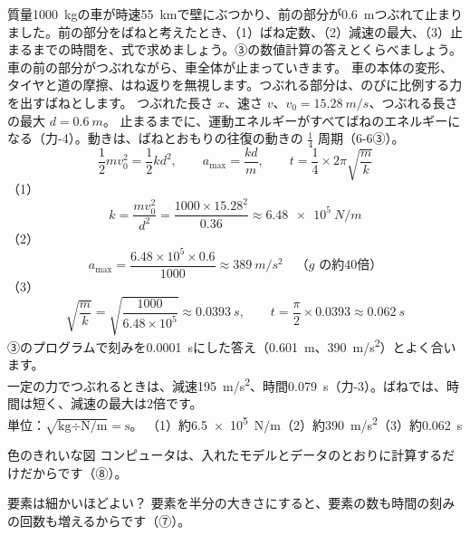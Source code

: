 \begin{phreidai}\label{ph:力-16:ex4}
質量\qty{1000}{kg}の車が時速\qty{55}{km}で壁にぶつかり、前の部分が\qty{0.6}{m}つぶれて止まりました。前の部分をばねと考えたとき、（1）ばね定数、（2）減速の最大、（3）止まるまでの時間を、式で求めましょう。③の数値計算の答えとくらべましょう。
\phbamen
車の前の部分がつぶれながら、車全体が止まっていきます。
\phmushi
車の本体の変形、タイヤと道の摩擦、はね返りを無視します。つぶれる部分は、のびに比例する力を出すばねとします。
\phzu
つぶれた長さ $x$、速さ $v$、$v_0=\qty{15.28}{m/s}$、つぶれる長さの最大 $d=\qty{0.6}{m}$。
\phriyu
止まるまでに、運動エネルギーがすべてばねのエネルギーになる（力-4）。動きは、ばねとおもりの往復の動きの $\tfrac{1}{4}$ 周期（\mbox{6-6③}）。
\phtateru
\[\frac{1}{2}mv_0^2=\frac{1}{2}kd^2,\qquad a_{\max}=\frac{kd}{m},\qquad t=\frac{1}{4}\times2\pi\sqrt{\frac{m}{k}}\]
\phtoku
（1）\[k=\frac{mv_0^2}{d^2}=\frac{1000\times15.28^2}{0.36}\approx\qty{6.48e5}{N/m}\]
（2）\[a_{\max}=\frac{6.48\times10^5\times0.6}{1000}\approx\qty{389}{m/s^2}\quad\text{（$g$ の約40倍）}\]
（3）\[\sqrt{\frac{m}{k}}=\sqrt{\frac{1000}{6.48\times10^5}}\approx\qty{0.0393}{s},\qquad t=\frac{\pi}{2}\times0.0393\approx\qty{0.062}{s}\]
\phtashikame
③のプログラムで刻みを\qty{0.0001}{s}にした答え（\qty{0.601}{m}、\qty{390}{m/s^2}）とよく合います。\\
一定の力でつぶれるときは、減速\qty{195}{m/s^2}、時間\qty{0.079}{s}（力-3）。ばねでは、時間は短く、減速の最大は2倍です。\\
単位：$\sqrt{\text{kg}\div\text{N/m}}=\text{s}$。
\kotae （1）約\qty{6.5e5}{N/m}（2）約\qty{390}{m/s^2}（3）約\qty{0.062}{s}
\end{phreidai}

\begin{tsumazuki}{色のきれいな図}
コンピュータは、入れたモデルとデータのとおりに計算するだけだからです（⑧）。
\end{tsumazuki}
\begin{tsumazuki}{要素は細かいほどよい？}
要素を半分の大きさにすると、要素の数も時間の刻みの回数も増えるからです（⑦）。
\end{tsumazuki}

